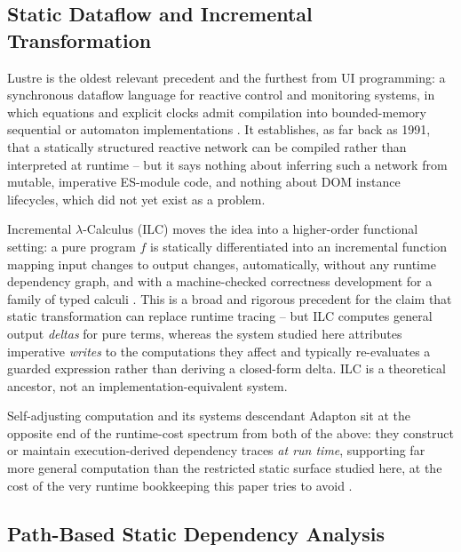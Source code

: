\documentclass[conference]{IEEEtran}
\begin{document}
\subsection{Static Dataflow and Incremental Transformation}

Lustre is the oldest relevant precedent and the furthest from UI programming:
a synchronous dataflow language for reactive control and monitoring systems,
in which equations and explicit clocks admit compilation into bounded-memory
sequential or automaton implementations \cite{lustre}. It establishes, as
far back as 1991, that a statically structured reactive network can be
compiled rather than interpreted at runtime -- but it says nothing about
inferring such a network from mutable, imperative ES-module code, and nothing
about DOM instance lifecycles, which did not yet exist as a problem.

Incremental $\lambda$-Calculus (ILC) moves the idea into a higher-order
functional setting: a pure program $f$ is statically differentiated into an
incremental function mapping input changes to output changes, automatically,
without any runtime dependency graph, and with a machine-checked correctness
development for a family of typed calculi \cite{incremental-lambda}. This is
a broad and rigorous precedent for the claim that static transformation can
replace runtime tracing -- but ILC computes general output \emph{deltas} for
pure terms, whereas the system studied here attributes imperative
\emph{writes} to the computations they affect and typically re-evaluates a
guarded expression rather than deriving a closed-form delta. ILC is a
theoretical ancestor, not an implementation-equivalent system.

Self-adjusting computation and its systems descendant Adapton sit at the
opposite end of the runtime-cost spectrum from both of the above: they
construct or maintain execution-derived dependency traces \emph{at run time},
supporting far more general computation than the restricted static surface
studied here, at the cost of the very runtime bookkeeping this paper tries to
avoid \cite{acar-sac,adapton}.

\subsection{Path-Based Static Dependency Analysis}
\end{document}
